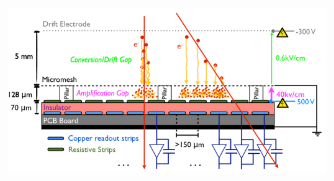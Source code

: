 \begin{figure}[!htb]
    \begin{center}
        \includegraphics[width=0.75\textwidth]{figures/nsw/nsw_mm_principle}
        \caption{
        }
        \label{fig:nsw_mm_principle}
    \end{center}
\end{figure}

